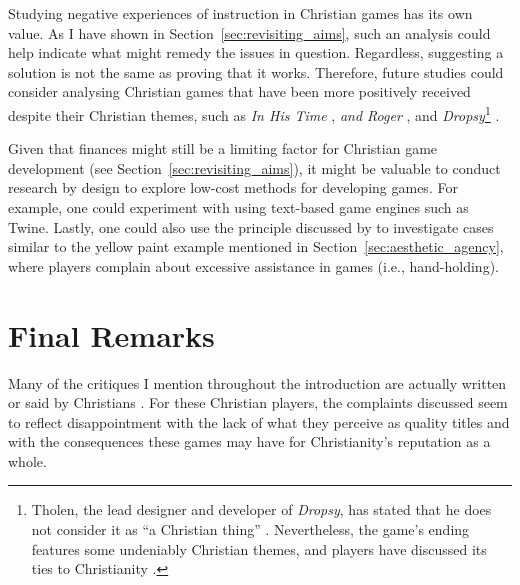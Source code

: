 Studying negative experiences of instruction in Christian games has its own value. As I have shown in Section~\ref{sec:revisiting_aims}, such an analysis could help indicate what might remedy the issues in question. Regardless, suggesting a solution is not the same as proving that it works. Therefore, future studies could consider analysing Christian games that have been more positively received despite their Christian themes, such as \textit{In His Time} \parencite{yona_in_2023}, \textit{and Roger} \parencite{yona_and_2025}, and \textit{Dropsy}\footnote{Tholen, the lead designer and developer of \textit{Dropsy}, has stated that he does not consider it as ``a Christian thing'' \parencite[para. 5]{sinclair_religious_2019}. Nevertheless, the game’s ending features some undeniably Christian themes, and players have discussed its ties to Christianity \parencite{mackerel_phones_new_2024, junecrashradio_the_2024, innuendo_studios_co-vids_2020}.} \parencite{tholen_dropsy_2015}. 

Given that finances might still be a limiting factor for Christian game development (see Section~\ref{sec:revisiting_aims}), it might be valuable to conduct research by design to explore low-cost methods for developing games. For example, one could experiment with using text-based game engines such as Twine. Lastly, one could also use the principle discussed by \textcite{king_virtue_2017} to investigate cases similar to the yellow paint example mentioned in Section~\ref{sec:aesthetic_agency}, where players complain about excessive assistance in games (i.e., hand-holding).


\section{Final Remarks}

Many of the critiques I mention throughout the introduction are actually written or said by Christians \parencite{schut_making_2013, hartgrove_why_2022, games_and_groceries_podcast_problem_2020, monkastery_new_2024, moon_channel_why_2023}. For these Christian players, the complaints discussed seem to reflect disappointment with the lack of what they perceive as quality titles and with the consequences these games may have for Christianity's reputation as a whole.

